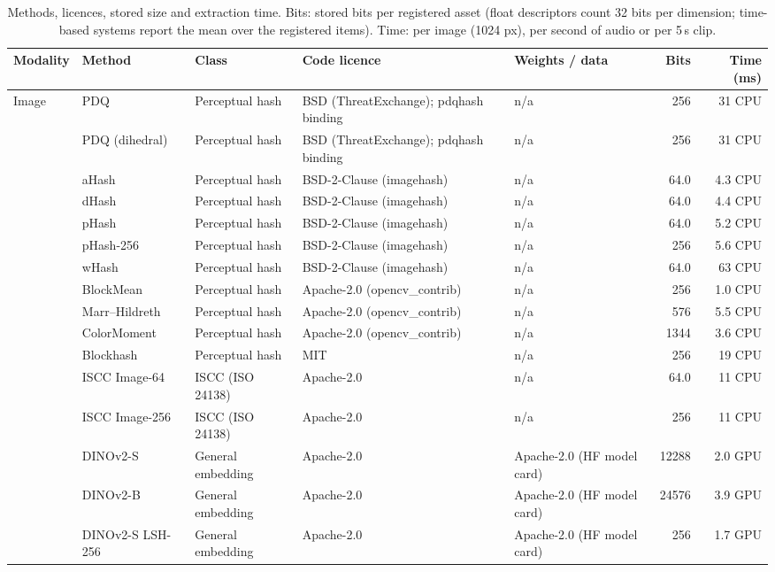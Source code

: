 \begin{table}[!t]
\centering
\scriptsize
\caption{Methods, licences, stored size and extraction time. Bits: stored bits per registered asset (float descriptors count 32 bits per dimension; time-based systems report the mean over the registered items). Time: per image (1024 px), per second of audio or per 5\,s clip.}
\label{tab:fp-methods}
\setlength{\tabcolsep}{3pt}
\begin{tabular}{lllp{3.3cm}p{3.6cm}rr}
\toprule
Modality & Method & Class & Code licence & Weights / data & Bits & Time (ms) \\
\midrule
Image & PDQ & Perceptual hash & BSD (ThreatExchange); pdqhash binding  & n/a & 256 & 31 CPU \\
 & PDQ (dihedral) & Perceptual hash & BSD (ThreatExchange); pdqhash binding  & n/a & 256 & 31 CPU \\
 & aHash & Perceptual hash & BSD-2-Clause (imagehash) & n/a & 64.0 & 4.3 CPU \\
 & dHash & Perceptual hash & BSD-2-Clause (imagehash) & n/a & 64.0 & 4.4 CPU \\
 & pHash & Perceptual hash & BSD-2-Clause (imagehash) & n/a & 64.0 & 5.2 CPU \\
 & pHash-256 & Perceptual hash & BSD-2-Clause (imagehash) & n/a & 256 & 5.6 CPU \\
 & wHash & Perceptual hash & BSD-2-Clause (imagehash) & n/a & 64.0 & 63 CPU \\
 & BlockMean & Perceptual hash & Apache-2.0 (opencv\_contrib) & n/a & 256 & 1.0 CPU \\
 & Marr–Hildreth & Perceptual hash & Apache-2.0 (opencv\_contrib) & n/a & 576 & 5.5 CPU \\
 & ColorMoment & Perceptual hash & Apache-2.0 (opencv\_contrib) & n/a & 1344 & 3.6 CPU \\
 & Blockhash & Perceptual hash & MIT & n/a & 256 & 19 CPU \\
 & ISCC Image-64 & ISCC (ISO 24138) & Apache-2.0 & n/a & 64.0 & 11 CPU \\
 & ISCC Image-256 & ISCC (ISO 24138) & Apache-2.0 & n/a & 256 & 11 CPU \\
 & DINOv2-S & General embedding & Apache-2.0 & Apache-2.0 (HF model card) & 12288 & 2.0 GPU \\
 & DINOv2-B & General embedding & Apache-2.0 & Apache-2.0 (HF model card) & 24576 & 3.9 GPU \\
 & DINOv2-S LSH-256 & General embedding & Apache-2.0 & Apache-2.0 (HF model card) & 256 & 1.7 GPU \\

\end{tabular}
\end{table}
